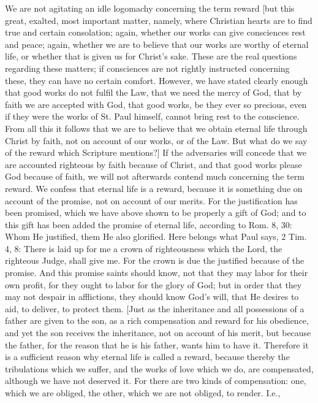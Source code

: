 We are not agitating an idle logomachy concerning the term reward
[but this great, exalted, most important matter, namely, where
Christian hearts are to find true and certain consolation; again,
whether our works can give consciences rest and peace; again, whether
we are to believe that our works are worthy of eternal life, or
whether that is given us for Christ's sake.  These are the real
questions regarding these matters; if consciences are not rightly
instructed concerning these, they can have no certain comfort.
However, we have stated clearly enough that good works do not fulfil
the Law, that we need the mercy of God, that by faith we are accepted
with God, that good works, be they ever so precious, even if they
were the works of St. Paul himself, cannot bring rest to the
conscience.  From all this it follows that we are to believe that we
obtain eternal life through Christ by faith, not on account of our
works, or of the Law.  But what do we say of the reward which
Scripture mentions?] If the adversaries will concede that we are
accounted righteous by faith because of Christ, and that good works
please God because of faith, we will not afterwards contend much
concerning the term reward.  We confess that eternal life is a reward,
because it is something due on account of the promise, not on
account of our merits.  For the justification has been promised,
which we have above shown to be properly a gift of God; and to this
gift has been added the promise of eternal life, according to Rom. 8,
30: Whom He justified, them He also glorified.  Here belongs what
Paul says, 2 Tim. 4, 8: There is laid up for me a crown of
righteousness which the Lord, the righteous Judge, shall give me.
For the crown is due the justified because of the promise.  And this
promise saints should know, not that they may labor for their own
profit, for they ought to labor for the glory of God; but in order
that they may not despair in afflictions, they should know God's will,
that He desires to aid, to deliver, to protect them.  [Just as the
inheritance and all possessions of a father are given to the son, as
a rich compensation and reward for his obedience, and yet the son
receives the inheritance, not on account of his merit, but because
the father, for the reason that he is his father, wants him to have
it.  Therefore it is a sufficient reason why eternal life is called a
reward, because thereby the tribulations which we suffer, and the
works of love which we do, are compensated, although we have not
deserved it.  For there are two kinds of compensation: one, which we
are obliged, the other, which we are not obliged, to render.  I.e.,
